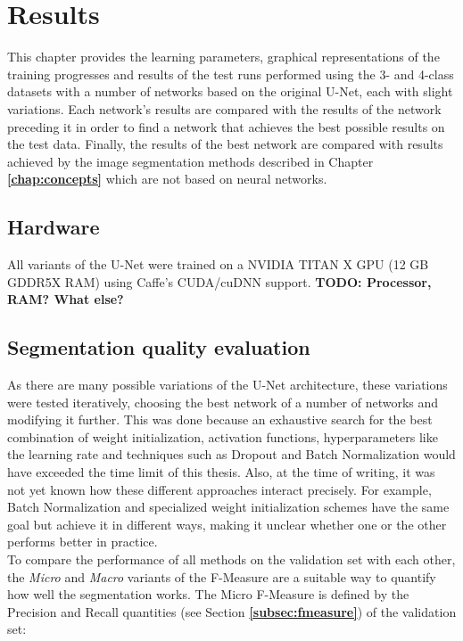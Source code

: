 \chapter {Results}
\label{chap:results}

This chapter provides the learning parameters, graphical representations of the training progresses and results of the test runs performed using the 3- and 4-class datasets with a number of networks based on the original U-Net, each with slight variations. Each network's results are compared with the results of the network preceding it in order to find a network that achieves the best possible results on the test data. Finally, the results of the best network are compared with results achieved by the image segmentation methods described in Chapter \textbf{\ref{chap:concepts}} which are not based on neural networks.

	\section{Hardware}
All variants of the U-Net were trained on a NVIDIA TITAN X GPU (12 GB GDDR5X RAM) using Caffe's CUDA/cuDNN support. \textbf{TODO: Processor, RAM? What else?}

	\section {Segmentation quality evaluation}

\noindent As there are many possible variations of the U-Net architecture, these variations were tested iteratively, choosing the best network of a number of networks and modifying it further. This was done because an exhaustive search for the best combination of weight initialization, activation functions, hyperparameters like the learning rate and techniques such as Dropout and Batch Normalization would have exceeded the time limit of this thesis. Also, at the time of writing, it was not yet known how these different approaches interact precisely. For example, Batch Normalization and specialized weight initialization schemes have the same goal but achieve it in different ways, making it unclear whether one or the other performs better in practice.\\

\noindent To compare the performance of all methods on the validation set with each other, the \textit{Micro} and \textit{Macro} variants of the F-Measure \cite{micromacro} are a suitable way to quantify how well the segmentation works. The Micro F-Measure is defined by the Precision and Recall quantities (see Section \textbf{\ref{subsec:fmeasure}}) of the validation set:


